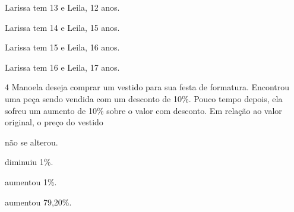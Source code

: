 \begin{escolha}%
\item Larissa tem 13 e Leila, 12 anos.
\item Larissa tem 14 e Leila, 15 anos.
\item Larissa tem 15 e Leila, 16 anos.
\item Larissa tem 16 e Leila, 17 anos.
\end{escolha}






\pagebreak

\num{4} Manoela deseja comprar um vestido para sua festa de formatura.
Encontrou uma peça sendo vendida com um desconto de 10\%. Pouco tempo
depois, ela sofreu um aumento de 10\% sobre o valor com desconto. Em
relação ao valor original, o preço do vestido

\begin{escolha}[itemsep=0pt]
\item não se alterou.
\item diminuiu 1\%.
\item aumentou 1\%.
\item aumentou 79,20\%.
\end{escolha}




